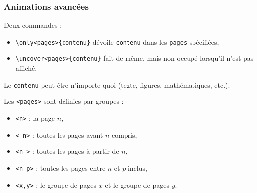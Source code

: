 \begin{frame}[fragile]
  \frametitle{Animations avancées}

Deux commandes :
\begin{itemize}
  \item \lstinline?\only<pages>{contenu}? dévoile \lstinline?contenu?  dans les \lstinline?pages? spécifiées,
  \item \lstinline?\uncover<pages>{contenu}? fait de même, mais  non occupé lorsqu'il n'est pas affiché.
\end{itemize}

Le \lstinline?contenu? peut être n'importe quoi (texte, figures, mathématiques, etc.).

\medskip
Les \lstinline?<pages>? sont définies par groupes :
\begin{itemize}
  \item \lstinline?<n>? : la page $n$,
  \item \lstinline?<-n>? : toutes les pages avant $n$ compris,
  \item \lstinline?<n->? : toutes les pages à partir de $n$,
  \item \lstinline?<n-p>? : toutes les pages entre $n$ et $p$ inclus,
  \item \lstinline?<x,y>? : le groupe de pages $x$ et le groupe de pages $y$.
\end{itemize}
\end{frame}




